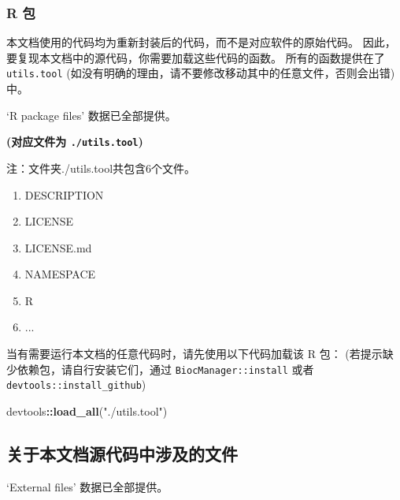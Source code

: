 \documentclass[
]{article}
\newenvironment{Shaded}{\begin{snugshade}}{\end{snugshade}}
\newcommand{\KeywordTok}[1]{\textcolor[rgb]{0.13,0.29,0.53}{\textbf{#1}}}
\newcommand{\NormalTok}[1]{#1}
\newcommand{\OperatorTok}[1]{\textcolor[rgb]{0.81,0.36,0.00}{\textbf{#1}}}
\newcommand{\StringTok}[1]{\textcolor[rgb]{0.31,0.60,0.02}{#1}}
\providecommand{\tightlist}{%
  \setlength{\itemsep}{0pt}\setlength{\parskip}{0pt}}
\begin{document}
\hypertarget{r-ux5305}{%
\subsubsection{R 包}\label{r-ux5305}}

本文档使用的代码均为重新封装后的代码，而不是对应软件的原始代码。
因此，要复现本文档中的源代码，你需要加载这些代码的函数。
所有的函数提供在了 \texttt{utils.tool} (如没有明确的理由，请不要修改移动其中的任意文件，否则会出错) 中。

`R package files' 数据已全部提供。

\textbf{(对应文件为 \texttt{./utils.tool})}

\begin{center}\begin{tcolorbox}[colback=gray!10, colframe=gray!50, width=0.9\linewidth, arc=1mm, boxrule=0.5pt]注：文件夹./utils.tool共包含6个文件。

\begin{enumerate}\tightlist
\item DESCRIPTION
\item LICENSE
\item LICENSE.md
\item NAMESPACE
\item R
\item ...
\end{enumerate}\end{tcolorbox}
\end{center}

当有需要运行本文档的任意代码时，请先使用以下代码加载该 R 包：
(若提示缺少依赖包，请自行安装它们，通过 \texttt{BiocManager::install} 或者 \texttt{devtools::install\_github})

\begin{Shaded}
\begin{Highlighting}[]
\NormalTok{devtools}\OperatorTok{::}\KeywordTok{load\_all}\NormalTok{(}\StringTok{"./utils.tool"}\NormalTok{)}
\end{Highlighting}
\end{Shaded}

\hypertarget{ux5173ux4e8eux672cux6587ux6863ux6e90ux4ee3ux7801ux4e2dux6d89ux53caux7684ux6587ux4ef6}{%
\subsection{关于本文档源代码中涉及的文件}\label{ux5173ux4e8eux672cux6587ux6863ux6e90ux4ee3ux7801ux4e2dux6d89ux53caux7684ux6587ux4ef6}}

`External files' 数据已全部提供。
\end{document}

